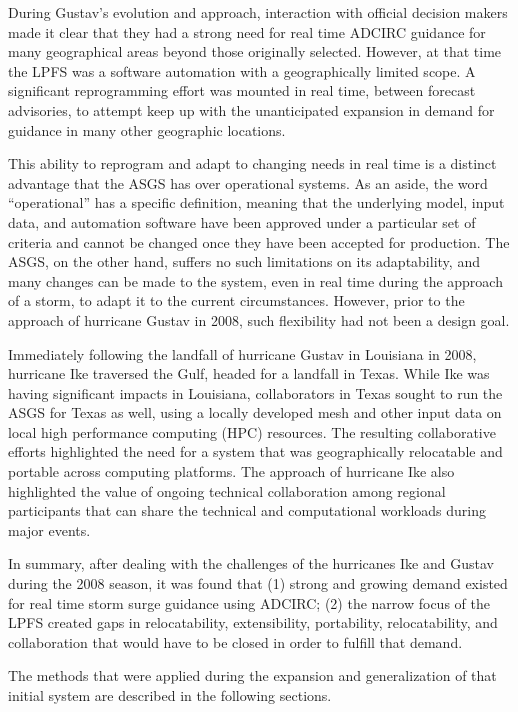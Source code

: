 \documentclass[jmse,article,submit,moreauthors,pdftex,12pt,a4paper]{mdpi}
\begin{document}
During Gustav's evolution and approach, interaction with official 
decision makers made it clear that they had a strong need for real 
time ADCIRC guidance for many geographical areas beyond those 
originally selected. However, at that time the LPFS was a software 
automation with a geographically limited scope. A significant 
reprogramming effort was mounted in real time, between forecast 
advisories, to attempt keep up with the unanticipated expansion in 
demand for guidance in many other geographic locations. 

This ability to reprogram and adapt to changing needs in real time 
is a distinct advantage that the ASGS has over operational systems. 
As an aside, the word ``operational'' has a specific definition, 
meaning that the underlying model, input data, and automation 
software have been approved under a particular set of criteria and 
cannot be changed once they have been accepted for production. The 
ASGS, on the other hand, suffers no such limitations on its 
adaptability, and many changes can be made to the system, even in 
real time during the approach of a storm, to adapt it to the current 
circumstances. However, prior to the approach of hurricane Gustav in 
2008, such flexibility had not been a design goal.

Immediately following the landfall of hurricane Gustav in Louisiana 
in 2008, hurricane Ike traversed the Gulf, headed for a landfall in 
Texas. While Ike was having significant impacts in Louisiana, 
collaborators in Texas sought to run the ASGS for Texas as well, 
using a locally developed mesh and other input data on local high 
performance computing (HPC) resources. The resulting collaborative 
efforts highlighted the need for a system that was geographically 
relocatable and portable across computing platforms. The approach of 
hurricane Ike also highlighted the value of ongoing technical 
collaboration among regional participants that can share the 
technical and computational workloads during major events. 

In summary, after dealing with the challenges of the hurricanes Ike 
and Gustav during the 2008 season, it was found that (1) strong and 
growing demand existed for real time storm surge guidance using 
ADCIRC; (2) the narrow focus of the LPFS created gaps in 
relocatability, extensibility, portability, relocatability, and 
collaboration that would have to be closed in order to fulfill that 
demand. 

The methods that were applied during the expansion and 
generalization of that initial system are described in the following 
sections. 
\end{document}

